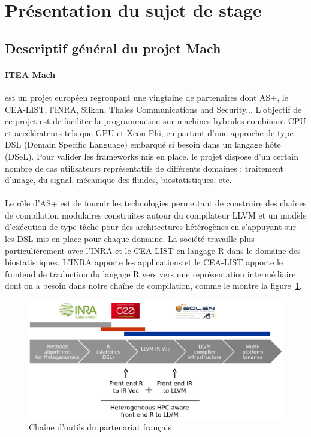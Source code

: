 \section{Présentation du sujet de stage}
\subsection{Descriptif général du projet Mach}
\paragraph{ITEA Mach~\cite{mach}}
est un projet européen regroupant une vingtaine de partenaires dont AS+, le
CEA-LIST, l'INRA, Silkan, Thales Communications and Security... L'objectif de ce
projet est de faciliter la programmation sur machines hybrides combinant CPU et
accélérateurs tels que GPU et Xeon-Phi, en partant d'une approche de type DSL
(Domain Specific Language) embarqué si besoin dans un langage hôte (DSeL). Pour
valider les frameworks mis en place, le projet dispose d’un certain nombre de
cas utilisateurs représentatifs de différents domaines : traitement d’image, du
signal, mécanique des fluides, biostatistiques, etc.

\paragraph{}
Le rôle d'AS+ est de fournir les technologies permettant de construire des
chaînes de compilation modulaires construites autour du compilateur LLVM et un
modèle d’exécution de type tâche pour des architectures hétérogènes en
s’appuyant sur les DSL mis en place pour chaque domaine. La société travaille
plus particulièrement avec l’INRA et le CEA-LIST en langage R dans le domaine
des biostatistiques. L’INRA apporte les applications et le CEA-LIST apporte le
frontend de traduction du langage R vers vers une représentation intermédiaire
dont on a besoin dans notre chaîne de compilation, comme le montre la
figure~\ref{toolchain_fr}.

\begin{figure}[h!]
   \begin{center}
      \includegraphics[width=135mm]{./images/toolchain_fr.png}
   \end{center}
   \caption{Chaîne d'outils du partenariat français~\cite{toolchain_fr}}
   \label{toolchain_fr}
\end{figure}


